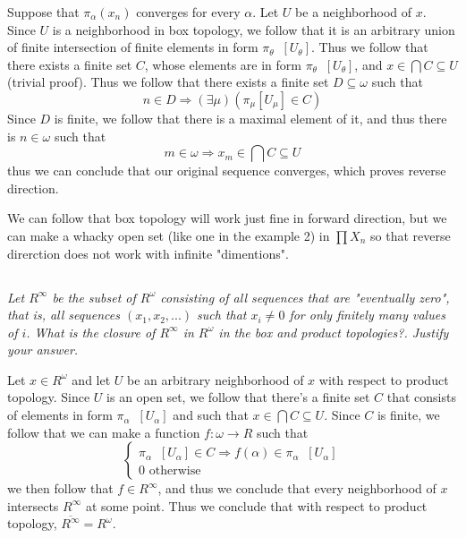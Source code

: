 \documentclass[11pt,oneside,titlepage]{book}
\DeclareMathOperator \inv {^{-1}}
\DeclareMathOperator \ra {\Rightarrow}
\begin{document}
Suppose that $\pi_\alpha(x_n)$ converges for every $\alpha$. Let $U$ be a neighborhood of
$x$. Since $U$ is a neighborhood in box topology, we follow that it is an
arbitrary union of finite intersection of finite elements in form $\pi_\theta\inv[U_\theta]$.
Thus we follow that there exists a finite set $C$, whose elements
are in form $\pi_\theta\inv[U_\theta]$, and $x \in \bigcap{C} \subseteq U$ (trivial proof).
Thus we follow that there exists a finite set $D \subseteq \omega$ such that
$$n \in D \ra (\exists \mu)(\pi_\mu[U_\mu] \in C)$$
Since $D$ is finite, we follow that there is a maximal element of it, and thus there
is $n \in \omega$ such that
$$m \in \omega \ra x_m \in \bigcap{C} \subseteq U$$
thus we can conclude that our original sequence converges, which proves reverse direction.

We can follow that box topology will work just fine in forward direction, but we can
make a whacky open set (like one in the example 2) in $\prod X_n$ so that reverse
direrction does not work with infinite "dimentions".

\subsection{}

\textit{Let $R^\infty$ be the subset of $R^\omega$ consisting of all sequences that are
  "eventually zero", that is, all sequences $(x_1, x_2, ...)$ such that $x_i \neq 0$ for only
  finitely many values of $i$. What is the closure of $R^\infty$ in $R^\omega$ in the box
  and product topologies?. Justify your answer.
}

Let $x \in R^\omega$ and let $U$ be an arbitrary neighborhood of $x$ with respect to
product topology.
Since $U$ is an open set, we follow that there's a finite set $C$ that consists
of elements in form $\pi_\alpha\inv[U_\alpha]$ and such that $x \in \bigcap{C} \subseteq U$.
Since $C$ is finite, we follow that we can make a function $f: \omega \to R$ such that
$$
\begin{cases}
  \pi_\alpha\inv[U_\alpha] \in C \ra f(\alpha) \in \pi_\alpha\inv[U_\alpha]  \\
  0 \text{ otherwise}
\end{cases}
$$
we then follow that $f \in R^\infty$, and thus we conclude that every neighborhood of $x$
intersects $R^\infty$ at some point. Thus we conclude that
with respect to product topology, $\overline{R^\infty} = R^\omega$.
\end{document}

